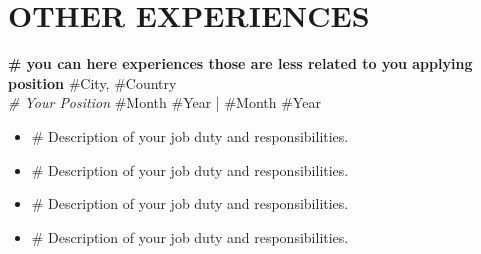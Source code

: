 \section*{OTHER EXPERIENCES}
\noindent
\textbf{\# you can here experiences those are less related to you applying position}  \hfill \#City, \#Country\\ %
\textit{\# Your Position} \hfill \#Month \#Year | \#Month \#Year %
\begin{itemize}
    \item \# Description of your job duty and responsibilities.
    \item \# Description of your job duty and responsibilities.
    \item \# Description of your job duty and responsibilities.
    \item \# Description of your job duty and responsibilities.
\end{itemize}